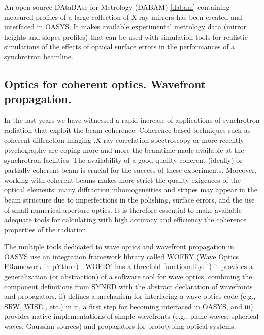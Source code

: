 \documentclass{aip-cp}
\begin{document}
An open-source DAtaBAse for Metrology (DABAM) \ref{dabam} containing measured profiles of a large collection of X-ray mirrors has been created and interfaced in OASYS. It makes available experimental metrology data (mirror heights and slopes profiles) that can be used with simulation tools for realistic simulations of the effects of optical surface errors in the performances of a synchrotron beamline.


\subsection{Optics for coherent optics. Wavefront propagation.}

In the last years we have witnessed a rapid increase of applications of synchrotron radiation that exploit the beam coherence. Coherence-based techniques such as coherent diffraction imaging ,X-ray correlation spectroscopy or more recently ptychography are coping more and more the beamtime made available at the synchrotron facilities. The availability of a good quality coherent (ideally) or partially-coherent beam is crucial for the success of these experiments. Moreover, working with coherent beams makes more strict the quality exigences of the optical elements: many diffraction inhomogeneities and stripes may appear in the beam structure due to imperfections in the polishing, surface errors, and the use of small numerical aperture optics. It is therefore essential to make available adequate tools for calculating with high accuracy and efficiency the coherence properties of the radiation. 

The multiple tools dedicated to wave optics and wavefront propagation in OASYS use an integration framework library called WOFRY (Wave Optics FRamework in pYthon) \cite{oasys2}. WOFRY has a threefold functionality: i) it provides a generalization (or abstraction) of a software tool for wave optics, combining the component definitions from SYNED with the abstract declaration of wavefronts and propagators, ii) defines a mechanism for interfacing a wave optics code (e.g., SRW, WISE \cite{wise}, etc.) in it, a first step for becoming interfaced in OASYS, and iii) provides native implementations of simple wavefronts (e.g., plane waves, spherical waves, Gaussian sources) and propagators for prototyping optical systems.
\end{document}
